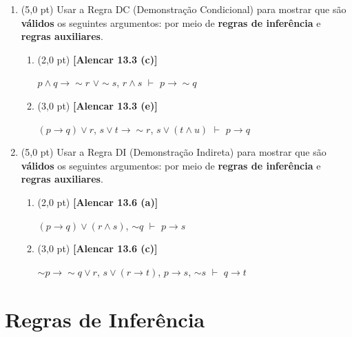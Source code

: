 \documentclass[12pt,a4paper,oneside]{article}
\begin{document}
\begin{enumerate}
	\item (5,0 pt) Usar a Regra DC (Demonstração Condicional) para mostrar que são {\bf válidos} os seguintes argumentos: por meio de {\bf regras de inferência} e {\bf regras auxiliares}.
	\begin{enumerate}
		\item (2,0 pt) {\bf [Alencar 13.3 (c)]} 
		\begin{center}
			$p \wedge q \rightarrow \sim r$ $\vee \sim s$, $r \wedge s$ $\vdash$ $p \rightarrow \sim q$
		\end{center}
		
		
		\item (3,0 pt) {\bf [Alencar 13.3 (e)]} 
		\begin{center}
			$(p \rightarrow q) \vee r$, $s \vee t \rightarrow \sim r$, $s \vee (t \wedge u)$ $\vdash$ $p \rightarrow q$
		\end{center}
		
	\end{enumerate}
	
	\item (5,0 pt) Usar a Regra DI (Demonstração Indireta) para mostrar que são {\bf válidos} os seguintes argumentos: por meio de {\bf regras de inferência} e {\bf regras auxiliares}.
	\begin{enumerate}
		\item (2,0 pt) {\bf [Alencar 13.6 (a)]} 
		\begin{center}
			$(p \rightarrow q) \vee (r \wedge s)$, $\sim q$ $\vdash$ $p \rightarrow s$
		\end{center}
		
		\item (3,0 pt) {\bf [Alencar 13.6 (c)]} 
		\begin{center}
			$\sim p \rightarrow \sim q \vee r$, $s \vee (r \rightarrow t)$, $p \rightarrow s$, $\sim s$ $\vdash$ $q \rightarrow t$
		\end{center}
		
	\end{enumerate}

\end{enumerate}

\newpage

\section*{Regras de Inferência}
\end{document}
